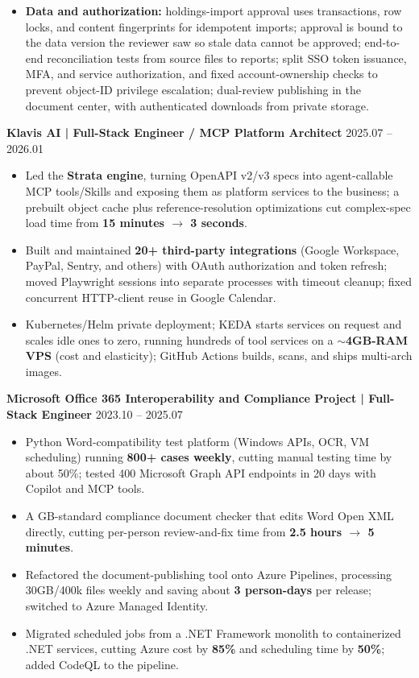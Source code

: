 \documentclass[10pt,a4paper]{article}
\begin{document}
\begin{itemize}
	\item \textbf{Data and authorization:} holdings-import approval uses transactions, row locks, and content fingerprints for idempotent imports; approval is bound to the data version the reviewer saw so stale data cannot be approved; end-to-end reconciliation tests from source files to reports; split SSO token issuance, MFA, and service authorization, and fixed account-ownership checks to prevent object-ID privilege escalation; dual-review publishing in the document center, with authenticated downloads from private storage.
\end{itemize}

\textbf{Klavis AI | Full-Stack Engineer / MCP Platform Architect} \hfill 2025.07 -- 2026.01
\begin{itemize}
	\item Led the \textbf{Strata engine}, turning OpenAPI v2/v3 specs into agent-callable MCP tools/Skills and exposing them as platform services to the business; a prebuilt object cache plus reference-resolution optimizations cut complex-spec load time from \textbf{15 minutes $\rightarrow$ 3 seconds}.
	\item Built and maintained \textbf{20+ third-party integrations} (Google Workspace, PayPal, Sentry, and others) with OAuth authorization and token refresh; moved Playwright sessions into separate processes with timeout cleanup; fixed concurrent HTTP-client reuse in Google Calendar.
	\item Kubernetes/Helm private deployment; KEDA starts services on request and scales idle ones to zero, running hundreds of tool services on a $\sim$\textbf{4GB-RAM VPS} (cost and elasticity); GitHub Actions builds, scans, and ships multi-arch images.
\end{itemize}

\textbf{Microsoft Office 365 Interoperability and Compliance Project | Full-Stack Engineer} \hfill 2023.10 -- 2025.07
\begin{itemize}
	\item Python Word-compatibility test platform (Windows APIs, OCR, VM scheduling) running \textbf{800+ cases weekly}, cutting manual testing time by about 50\%; tested 400 Microsoft Graph API endpoints in 20 days with Copilot and MCP tools.
	\item A GB-standard compliance document checker that edits Word Open XML directly, cutting per-person review-and-fix time from \textbf{2.5 hours $\rightarrow$ 5 minutes}.
	\item Refactored the document-publishing tool onto Azure Pipelines, processing 30GB/400k files weekly and saving about \textbf{3 person-days} per release; switched to Azure Managed Identity.
	\item Migrated scheduled jobs from a .NET Framework monolith to containerized .NET services, cutting Azure cost by \textbf{85\%} and scheduling time by \textbf{50\%}; added CodeQL to the pipeline.
\end{itemize}
\end{document}
